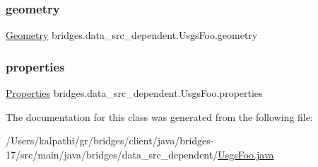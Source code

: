 \subsubsection{\texorpdfstring{geometry}{geometry}}
{\footnotesize\ttfamily \mbox{\hyperlink{classbridges_1_1data__src__dependent_1_1_usgs_foo_1_1_geometry}{Geometry}} bridges.\+data\+\_\+src\+\_\+dependent.\+Usgs\+Foo.\+geometry}

\mbox{\label{classbridges_1_1data__src__dependent_1_1_usgs_foo_a030d83e136f146824b5bda34a4c6fd1c}} 
\subsubsection{\texorpdfstring{properties}{properties}}
{\footnotesize\ttfamily \mbox{\hyperlink{classbridges_1_1data__src__dependent_1_1_usgs_foo_1_1_properties}{Properties}} bridges.\+data\+\_\+src\+\_\+dependent.\+Usgs\+Foo.\+properties}



The documentation for this class was generated from the following file\+:\begin{DoxyCompactItemize}
\item 
/\+Users/kalpathi/gr/bridges/client/java/bridges-\/17/src/main/java/bridges/data\+\_\+src\+\_\+dependent/\mbox{\hyperlink{_usgs_foo_8java}{Usgs\+Foo.\+java}}\end{DoxyCompactItemize}
